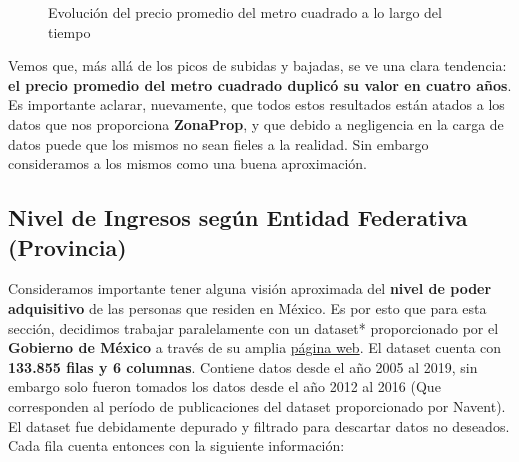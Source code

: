 \documentclass[
10pt, %
a4paper, %
oneside, %
headinclude,footinclude, %
BCOR5mm, %
]{scrartcl}
\begin{document}
    \begin{figure}[H]
        \caption{Evoluci\'on del precio promedio del metro cuadrado a lo largo del tiempo}
        \label{fig:inflacion}
    \end{figure}
    
    Vemos que, m\'as all\'a de los picos de subidas y bajadas, se ve una clara tendencia: \textbf{el precio promedio del metro cuadrado duplic\'o su valor en cuatro años}. Es importante aclarar, nuevamente, que todos estos resultados est\'an atados a los datos que nos proporciona \textbf{ZonaProp}, y que debido a negligencia en la carga de datos puede que los mismos no sean fieles a la realidad. Sin embargo consideramos a los mismos como una buena aproximaci\'on.

\let\thefootnote\relax{}

\newpage
\subsection{Nivel de Ingresos según Entidad Federativa (Provincia)}

Consideramos importante tener alguna visión aproximada del \textbf{nivel de poder adquisitivo} de las personas que residen en México. 
Es por esto que para esta sección, decidimos trabajar paralelamente con un dataset* proporcionado por el \textbf{Gobierno de México} a través de su amplia \href{https://datos.gob.mx}{página web}.
\vskip 2mm
El dataset cuenta con \textbf{133.855 filas y 6 columnas}. Contiene datos desde el año 2005 al 2019, sin embargo solo fueron tomados los datos desde el año 2012 al 2016 (Que corresponden al período de publicaciones del dataset proporcionado por Navent). El dataset fue debidamente depurado y filtrado para descartar datos no deseados. 
\vskip 2mm
Cada fila cuenta entonces con la siguiente información:
\end{document}
